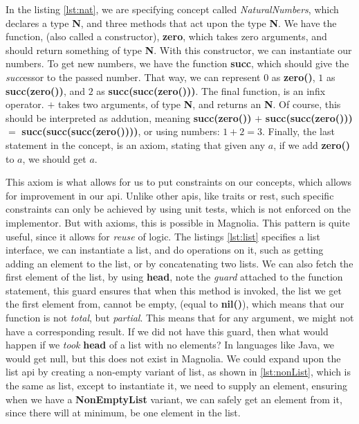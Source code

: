 In the listing \ref{lst:nat}, we are specifying concept called
\textit{NaturalNumbers}, which declares a type \textbf{N}, and three methods
that act upon the type \textbf{N}. We have the function, (also called a
constructor), \textbf{zero}, which takes zero arguments, and should return
something of type \textbf{N}. With this constructor, we can instantiate our
numbers. To get new numbers, we have the function \textbf{succ}, which should
give the \textit{succ}essor to the passed number. That way, we can represent $0$
as \textbf{zero()}, $1$ as \textbf{succ(zero())}, and $2$ as
\textbf{succ(succ(zero()))}. The final function, is an infix operator. $+$ takes
two arguments, of type \textbf{N}, and returns an \textbf{N}. Of course, this
should be interpreted as addution, meaning \textbf{succ(zero())} $+$
\textbf{succ(succ(zero()))} $=$ \textbf{succ(succ(succ(zero())))}, or using
numbers: $1 + 2 = 3$. Finally, the last statement in the concept, is an axiom,
stating that given any $a$, if we add \textbf{zero()} to $a$, we should get $a$.

This axiom is what allows for us to put constraints on our concepts, which
allows for improvement in our \gls{api}. Unlike other \gls{api}s, like traits or
\gls{rest}, such specific constraints can only be achieved by using unit tests,
which is not enforced on the implementor. But with axioms, this is possible in
Magnolia. This pattern is quite useful, since it allows for \textit{reuse} of
logic. The listings \ref{lst:list} specifies a list interface, we can
instantiate a list, and do operations on it, such as getting adding an element to
the list, or by concatenating two lists. We can also fetch the first element of
the list, by using \textbf{head}, note the \textit{guard} attached to the
function statement, this guard ensures that when this method is invoked, the
list we get the first element from, cannot be empty, (equal to \textbf{nil()}),
which means that our function is not \textit{total}, but \textit{partial}. This
means that for any argument, we might not have a corresponding result. If we did
not have this guard, then what would happen if we \textit{took} \textbf{head} of a list
with no elements? In languages like Java, we would get null, but this does not
exist in Magnolia. We could expand upon the list \gls{api} by creating a
non-empty variant of list, as shown in \ref{lst:nonList}, which is the same as
list, except to instantiate it, we need to supply an element, ensuring when we
have a \textbf{NonEmptyList} variant, we can safely get an element from it,
since there will at minimum, be one element in the list.

